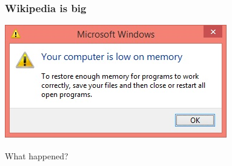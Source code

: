 \documentclass{beamer}
\begin{document}
{
  \pagecolor{black}

\begin{frame}[plain]
\end{frame}
}

\begin{frame}
  \frametitle{Wikipedia is big}
  \includegraphics[width=\textwidth]{images/outofmemory.jpg}
\end{frame}

\begin{frame}

  \center
  {\huge What happened?}

\end{frame}
\end{document}
